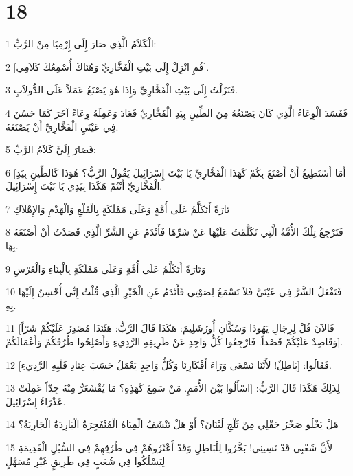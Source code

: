 \chapter{18}

\par 1 الْكَلاَمُ الَّذِي صَارَ إِلَى إِرْمِيَا مِنْ الرَّبِّ:
\par 2 [قُمِ انْزِلْ إِلَى بَيْتِ الْفَخَّارِيِّ وَهُنَاكَ أُسْمِعُكَ كَلاَمِي].
\par 3 فَنَزَلْتُ إِلَى بَيْتِ الْفَخَّارِيِّ وَإِذَا هُوَ يَصْنَعُ عَمَلاً عَلَى الدُّولاَبِ.
\par 4 فَفَسَدَ الْوِعَاءُ الَّذِي كَانَ يَصْنَعُهُ مِنَ الطِّينِ بِيَدِ الْفَخَّارِيِّ فَعَادَ وَعَمِلَهُ وِعَاءً آخَرَ كَمَا حَسُنَ فِي عَيْنَيِ الْفَخَّارِيِّ أَنْ يَصْنَعَهُ.
\par 5 فَصَارَ إِلَيَّ كَلاَمُ الرَّبِّ:
\par 6 [أَمَا أَسْتَطِيعُ أَنْ أَصْنَعَ بِكُمْ كَهَذَا الْفَخَّارِيِّ يَا بَيْتَ إِسْرَائِيلَ يَقُولُ الرَّبُّ؟ هُوَذَا كَالطِّينِ بِيَدِ الْفَخَّارِيِّ أَنْتُمْ هَكَذَا بِيَدِي يَا بَيْتَ إِسْرَائِيلَ.
\par 7 تَارَةً أَتَكَلَّمُ عَلَى أُمَّةٍ وَعَلَى مَمْلَكَةٍ بِالْقَلْعِ وَالْهَدْمِ وَالإِهْلاَكِ
\par 8 فَتَرْجِعُ تِلْكَ الأُمَّةُ الَّتِي تَكَلَّمْتُ عَلَيْهَا عَنْ شَرِّهَا فَأَنْدَمُ عَنِ الشَّرِّ الَّذِي قَصَدْتُ أَنْ أَصْنَعَهُ بِهَا.
\par 9 وَتَارَةً أَتَكَلَّمُ عَلَى أُمَّةٍ وَعَلَى مَمْلَكَةٍ بِالْبِنَاءِ وَالْغَرْسِ
\par 10 فَتَفْعَلُ الشَّرَّ فِي عَيْنَيَّ فَلاَ تَسْمَعُ لِصَوْتِي فَأَنْدَمُ عَنِ الْخَيْرِ الَّذِي قُلْتُ إِنِّي أُحْسِنُ إِلَيْهَا بِهِ.
\par 11 [فَالآنَ قُلْ لِرِجَالِ يَهُوذَا وَسُكَّانِ أُورُشَلِيمَ: هَكَذَا قَالَ الرَّبُّ: هَئَنَذَا مُصْدِرٌ عَلَيْكُمْ شَرّاً وَقَاصِدٌ عَلَيْكُمْ قَصْداً. فَارْجِعُوا كُلُّ وَاحِدٍ عَنْ طَرِيقِهِ الرَّدِيءِ وَأَصْلِحُوا طُرُقَكُمْ وَأَعْمَالَكُمْ].
\par 12 فَقَالُوا: [بَاطِلٌ! لأَنَّنَا نَسْعَى وَرَاءَ أَفْكَارِنَا وَكُلُّ وَاحِدٍ يَعْمَلُ حَسَبَ عِنَادِ قَلْبِهِ الرَّدِيءِ].
\par 13 لِذَلِكَ هَكَذَا قَالَ الرَّبُّ: [اسْأَلُوا بَيْنَ الأُمَمِ. مَنْ سَمِعَ كَهَذِهِ؟ مَا يُقْشَعَرُّ مِنْهُ جِدّاً عَمِلَتْ عَذْرَاءُ إِسْرَائِيلَ.
\par 14 هَلْ يَخْلُو صَخْرُ حَقْلِي مِنْ ثَلْجِ لُبْنَانَ؟ أَوْ هَلْ تَنْشَفُ الْمِيَاهُ الْمُنْفَجِرَةُ الْبَارِدَةُ الْجَارِيَةُ؟
\par 15 لأَنَّ شَعْبِي قَدْ نَسِينِي! بَخَّرُوا لِلْبَاطِلِ وَقَدْ أَعْثَرُوهُمْ فِي طُرُقِهِمْ فِي السُّبُلِ الْقَدِيمَةِ لِيَسْلُكُوا فِي شُعَبٍ فِي طَرِيقٍ غَيْرِ مُسَهَّلٍ

